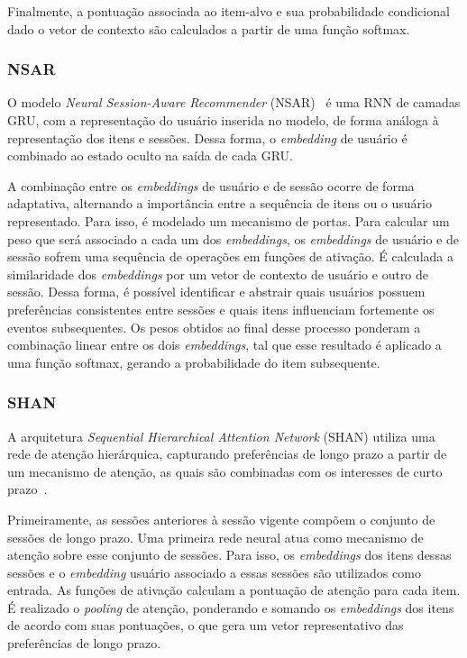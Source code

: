 Finalmente, a pontuação associada ao item-alvo e sua probabilidade condicional
dado o vetor de contexto são calculados a partir de uma função softmax.
  
\subsubsection{NSAR}
 O modelo \textit{Neural
Session-Aware Recommender} (NSAR)~\cite{phuong2019neural} é uma RNN de camadas
GRU, com a representação do usuário inserida no modelo, de forma análoga à
representação dos itens e sessões. Dessa forma, o \textit{embedding} de usuário
é combinado ao estado oculto na saída de cada GRU.

A combinação entre os \textit{embeddings} de usuário e de sessão ocorre de forma
adaptativa, alternando a importância entre a sequência de itens ou o usuário
representado. Para isso, é modelado um mecanismo de portas. Para calcular um
peso que será associado a cada um dos \textit{embeddings}, os
\textit{embeddings} de usuário e de sessão sofrem uma sequência de operações em
funções de ativação. É calculada a similaridade dos \textit{embeddings} por um
vetor de contexto de usuário e outro de sessão. Dessa forma, é possível
identificar e abstrair quais usuários possuem preferências consistentes entre
sessões e quais itens influenciam fortemente os eventos subsequentes. Os pesos
obtidos ao final desse processo ponderam a combinação linear entre os dois
\textit{embeddings}, tal que esse resultado é aplicado a uma função softmax,
gerando a probabilidade do item subsequente.

\subsubsection{SHAN}
A arquitetura \textit{Sequential Hierarchical Attention Network} (SHAN) utiliza uma rede
de atenção hierárquica, capturando preferências de longo prazo a partir de um
mecanismo de atenção, as quais são combinadas com os interesses de curto
prazo~\cite{shan}.

Primeiramente, as sessões anteriores à sessão vigente compõem o conjunto de
sessões de longo prazo. Uma primeira rede neural atua como mecanismo de atenção
sobre esse conjunto de sessões. Para isso, os \textit{embeddings} dos itens
dessas sessões e o \textit{embedding} usuário associado a essas sessões são
utilizados como entrada. As funções de ativação calculam a pontuação de atenção
para cada item. É realizado o \textit{pooling} de atenção, ponderando e somando
os \textit{embeddings} dos itens de acordo com suas pontuações, o que gera um
vetor representativo das preferências de longo prazo.

